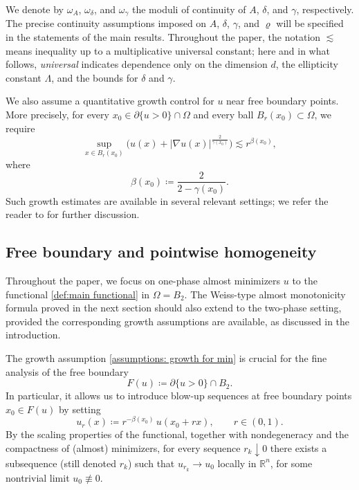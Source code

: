 \documentclass[reqno,11pt]{amsart}
\newcommand{\1}{\mathds{1}}  %
\numberwithin{equation}{section}
\begin{document}
We denote by $\omega_A$, $\omega_\delta$, and $\omega_\gamma$ the moduli of continuity of $A$, $\delta$, and $\gamma$, respectively. The precise continuity assumptions imposed on $A$, $\delta$, $\gamma$, and $\varrho$ will be specified in the statements of the main results. Throughout the paper, the notation $\lesssim$ means inequality up to a multiplicative universal constant; here and in what follows, \emph{universal} indicates dependence only on the dimension $d$, the ellipticity constant $\Lambda$, and the bounds for $\delta$ and $\gamma$.

We also assume a quantitative growth control for $u$ near free boundary points. More precisely, for every $x_0\in \partial\{u>0\}\cap\Omega$ and every ball $B_r(x_0)\subset\Omega$, we require
\begin{equation}\label{assumptions: growth for min}
    \sup_{x\in B_r(x_0)}\Big(u(x)+|\nabla u(x)|^{\frac{2}{\gamma(x_0)}}\Big) \lesssim r^{\beta(x_0)},
\end{equation}
where
\[
    \beta(x_0) \coloneqq \frac{2}{2-\gamma(x_0)}.
\]
Such growth estimates are available in several relevant settings; we refer the reader to \cite{ASTU1,ASTU2} for further discussion.

\subsection{Free boundary and pointwise homogeneity}

Throughout the paper, we focus on one-phase almost minimizers $u$ to the functional \eqref{def:main functional} in $\Omega = B_2$. The Weiss-type almost monotonicity formula proved in the next section should also extend to the two-phase setting, provided the corresponding growth assumptions are available, as discussed in the introduction.

The growth assumption \eqref{assumptions: growth for min} is crucial for the fine analysis of the free boundary
\[
    F(u)\coloneqq \partial\{u>0\}\cap B_2.
\]
In particular, it allows us to introduce blow-up sequences at free boundary points $x_0\in F(u)$ by setting
\[
    u_r(x)\coloneqq r^{-\beta(x_0)}\,u(x_0+rx),\qquad r\in(0,1).
\]
By the scaling properties of the functional, together with nondegeneracy and the compactness of (almost) minimizers, for every sequence $r_k\downarrow 0$ there exists a subsequence (still denoted $r_k$) such that $u_{r_k}\to u_0$ locally in $\mathbb{R}^n$, for some nontrivial limit $u_0\not\equiv 0$.
\end{document}
